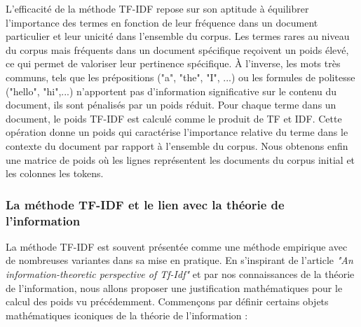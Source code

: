 \documentclass[12pt]{article}
\theoremstyle{definition}
\begin{document}
	L'efficacité de la méthode TF-IDF repose sur son aptitude à équilibrer l'importance des termes en fonction de leur fréquence dans un document particulier et leur unicité dans l'ensemble du corpus. Les termes rares au niveau du corpus mais fréquents dans un document spécifique reçoivent un poids élevé, ce qui permet de valoriser leur pertinence spécifique. À l'inverse, les mots très communs, tels que les prépositions ("a", "the", "I", ...) ou les formules de politesse ("hello", "hi",...)  n'apportent pas d'information significative sur le contenu du document, ils sont pénalisés par un poids réduit. Pour chaque terme dans un document, le poids TF-IDF est calculé comme le produit de TF et IDF. Cette opération donne un poids qui caractérise l'importance relative du terme dans le contexte du document par rapport à l'ensemble du corpus. Nous obtenons enfin une matrice de poids où les lignes représentent les documents du corpus initial et les colonnes les tokens. 
	
	\subsubsection{La méthode TF-IDF et le lien avec la théorie de l'information}
	
	La méthode TF-IDF est souvent présentée comme une méthode empirique avec de nombreuses variantes dans sa mise en pratique. En s'inspirant de l'article \textit{"An information-theoretic perspective of Tf-Idf"} \cite{TF_IDF_measures} et par nos connaissances de la théorie de l'information, nous allons proposer une justification mathématiques pour le calcul des poids vu précédemment. Commençons par définir certains objets mathématiques iconiques de la théorie de l'information :
	
\end{document}
